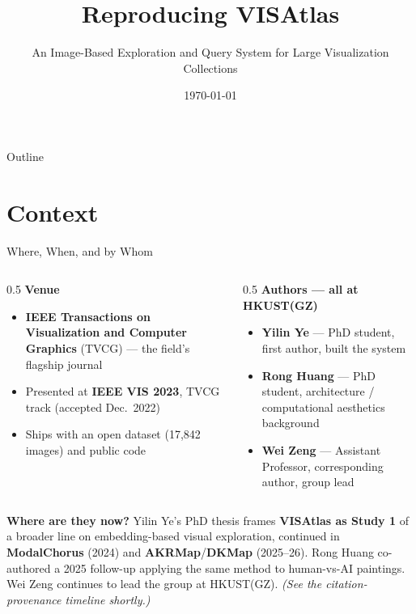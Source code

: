 \documentclass[aspectratio=169]{beamer}
\title{Reproducing VISAtlas}
\subtitle{An Image-Based Exploration and Query System for Large Visualization Collections}
\date{\today}
\begin{document}
\begin{frame}[plain]
  \titlepage
\end{frame}

\begin{frame}{Outline}
  \tableofcontents
\end{frame}

\section{Context}

\begin{frame}{Where, When, and by Whom}
  \begin{columns}[T]
  \begin{column}{0.5\textwidth}
  \small
  \textbf{Venue}
  \begin{itemize}\small
    \item \textbf{IEEE Transactions on Visualization and Computer Graphics} (TVCG) --- the field's flagship journal
    \item Presented at \textbf{IEEE VIS 2023}, TVCG track (accepted Dec.\ 2022)
    \item Ships with an open dataset (17{,}842 images) and public code
  \end{itemize}
  \end{column}
  \begin{column}{0.5\textwidth}
  \small
  \textbf{Authors --- all at HKUST(GZ)}
  \begin{itemize}\small
    \item \textbf{Yilin Ye} --- PhD student, first author, built the system
    \item \textbf{Rong Huang} --- PhD student, architecture / computational aesthetics background
    \item \textbf{Wei Zeng} --- Assistant Professor, corresponding author, group lead
  \end{itemize}
  \end{column}
  \end{columns}
  \vspace{3mm}
  \begin{center}
    \setlength{\fboxsep}{4pt}%
    \colorbox{lumenTint}{%
      \parbox{0.94\textwidth}{\small
        \textbf{Where are they now?} Yilin Ye's PhD thesis frames \textbf{VISAtlas as Study 1} of a broader line on embedding-based visual exploration, continued in \textbf{ModalChorus} (2024) and \textbf{AKRMap}/\textbf{DKMap} (2025--26). Rong Huang co-authored a 2025 follow-up applying the same method to human-vs-AI paintings. Wei Zeng continues to lead the group at HKUST(GZ). \emph{(See the citation-provenance timeline shortly.)}}}%
  \end{center}
\end{frame}
\end{document}
